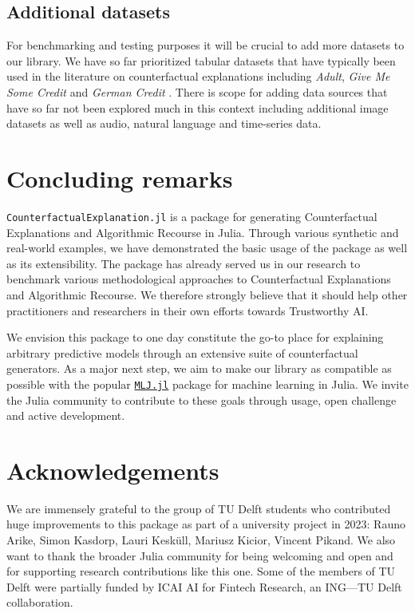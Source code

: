 \documentclass[
  letterpaper,
  DIV=11,
  numbers=noendperiod]{scrartcl}
\begin{document}
\hypertarget{additional-datasets}{%
\subsection{Additional datasets}\label{additional-datasets}}

For benchmarking and testing purposes it will be crucial to add more
datasets to our library. We have so far prioritized tabular datasets
that have typically been used in the literature on counterfactual
explanations including \emph{Adult}, \emph{Give Me Some Credit} and
\emph{German Credit} \cite{karimi2020survey}. There is scope for adding
data sources that have so far not been explored much in this context
including additional image datasets as well as audio, natural language
and time-series data.

\hypertarget{sec-conclude}{%
\section{Concluding remarks}\label{sec-conclude}}

\texttt{CounterfactualExplanation.jl} is a package for generating
Counterfactual Explanations and Algorithmic Recourse in Julia. Through
various synthetic and real-world examples, we have demonstrated the
basic usage of the package as well as its extensibility. The package has
already served us in our research to benchmark various methodological
approaches to Counterfactual Explanations and Algorithmic Recourse. We
therefore strongly believe that it should help other practitioners and
researchers in their own efforts towards Trustworthy AI.

We envision this package to one day constitute the go-to place for
explaining arbitrary predictive models through an extensive suite of
counterfactual generators. As a major next step, we aim to make our
library as compatible as possible with the popular
\href{https://alan-turing-institute.github.io/MLJ.jl/dev/}{\texttt{MLJ.jl}}
package for machine learning in Julia. We invite the Julia community to
contribute to these goals through usage, open challenge and active
development.

\hypertarget{sec-ack}{%
\section{Acknowledgements}\label{sec-ack}}

We are immensely grateful to the group of TU Delft students who
contributed huge improvements to this package as part of a university
project in 2023: Rauno Arike, Simon Kasdorp, Lauri Kesküll, Mariusz
Kicior, Vincent Pikand. We also want to thank the broader Julia
community for being welcoming and open and for supporting research
contributions like this one. Some of the members of TU Delft were
partially funded by ICAI AI for Fintech Research, an ING---TU Delft
collaboration.
\end{document}
